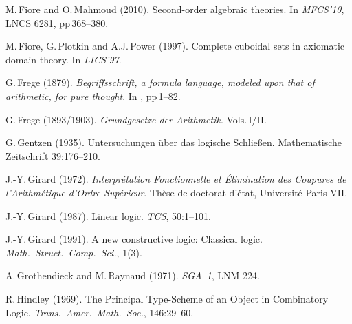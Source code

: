\documentclass[11pt,twocolumn]{article}
\begin{document}
{\begin{thebibliography}{000}
M.\,Fiore and O.\,Mahmoud (2010).   
\newblock Second-order algebraic theories.  
\newblock In \emph{MFCS'10}, LNCS 6281, pp\,368--380. 

M.\,Fiore, G.\,Plotkin and A.J.\,Power (1997). 
\newblock Complete cuboidal sets in axiomatic domain theory.  
\newblock In \emph{LICS'97}.

G.\,Frege (1879).
\newblock \emph{Begriffsschrift, a formula language, modeled upon that of
  arithmetic, for pure thought}. 
\newblock In \emph{\cite{vanHeijenoort}}, pp\,1--82.

G.\,Frege (1893/1903).
\newblock 
\emph{Grundgesetze der Arithmetik}.%
\newblock Vols.\,I/II.

G.\,Gentzen (1935). 
\newblock Untersuchungen \"uber das logische Schlie{\ss}en. 
\newblock Mathematische Zeitschrift 39:176--210.


J.-Y.\,Girard (1972).
\newblock \emph{Interpr\'{e}tation Fonctionnelle et \'{E}li\-mi\-na\-tion des
  Coupures de l'Arithm\'{e}tique d'Ordre Sup\'{e}rieur}.
\newblock Th\`{e}se de doctorat d'\'{e}tat, Universit\'{e} Paris VII. 

J.-Y.\,Girard (1987). 
\newblock Linear logic.
\newblock \emph{TCS}, 50:1--101.

J.-Y.\,Girard (1991). 
\newblock A new constructive logic: Classical logic.
\newblock \emph{Math.\ Struct.\ Comp.\ Sci.}, 1(3).

A.\,Grothendieck and M.\,Raynaud (1971).
\newblock \emph{SGA~1}, LNM 224.


R.\,Hindley (1969).
\newblock The Principal Type-Scheme of an Object in Combinatory Logic.
\newblock \emph{Trans.\ Amer.\ Math.\ Soc.}, 146:29--60.


\end{thebibliography}}
\end{document}
